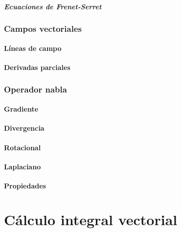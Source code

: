 \documentclass[12pt, fleqn]{report}                             %
\theoremstyle{break}                                            %
\begin{document}
                \subsubsection{Ecuaciones de Frenet-Serret}
            
        \section{Campos vectoriales}
        
            \subsection{Líneas de campo}
            
            \subsection{Derivadas parciales}
        
        \section{Operador nabla}
        
            \subsection{Gradiente}
            
            \subsection{Divergencia}
            
            \subsection{Rotacional}
            
            \subsection{Laplaciano}
            
            \subsection{Propiedades}



\part{Cálculo integral vectorial}
\end{document}
